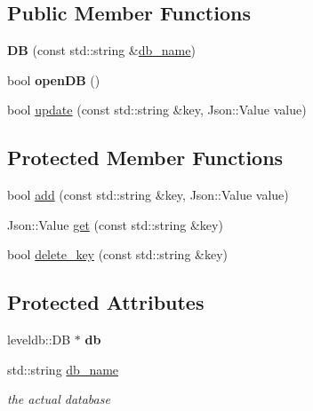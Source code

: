\subsection*{Public Member Functions}
\begin{DoxyCompactItemize}
\item 
{\bfseries DB} (const std\+::string \&\hyperlink{classDB_a8c58fbd6650f3d5850adf699d1ee7ada}{db\+\_\+name})\hypertarget{classDB_a85e27c8f4f3e3a519807996171552935}{}\label{classDB_a85e27c8f4f3e3a519807996171552935}

\item 
bool {\bfseries open\+DB} ()\hypertarget{classDB_a3f15981d4a972d3aa8076baae539c1fb}{}\label{classDB_a3f15981d4a972d3aa8076baae539c1fb}

\item 
bool \hyperlink{classDB_ab37e04fc57a20b5abe8960bccdfc73e9}{update} (const std\+::string \&key, Json\+::\+Value value)
\end{DoxyCompactItemize}
\subsection*{Protected Member Functions}
\begin{DoxyCompactItemize}
\item 
bool \hyperlink{classDB_ab77d1e0d8335375cf70105c748014358}{add} (const std\+::string \&key, Json\+::\+Value value)
\item 
Json\+::\+Value \hyperlink{classDB_a9f02db7e7b5f79d8daca90bcbc5962e6}{get} (const std\+::string \&key)
\item 
bool \hyperlink{classDB_a484efe20a1a0f520e76c882c34f28779}{delete\+\_\+key} (const std\+::string \&key)
\end{DoxyCompactItemize}
\subsection*{Protected Attributes}
\begin{DoxyCompactItemize}
\item 
leveldb\+::\+DB $\ast$ {\bfseries db}\hypertarget{classDB_af44b7dfd56993060c50d7554ef8689db}{}\label{classDB_af44b7dfd56993060c50d7554ef8689db}

\item 
std\+::string \hyperlink{classDB_a8c58fbd6650f3d5850adf699d1ee7ada}{db\+\_\+name}\hypertarget{classDB_a8c58fbd6650f3d5850adf699d1ee7ada}{}\label{classDB_a8c58fbd6650f3d5850adf699d1ee7ada}

\begin{DoxyCompactList}\small\item\em the actual database \end{DoxyCompactList}\end{DoxyCompactItemize}


